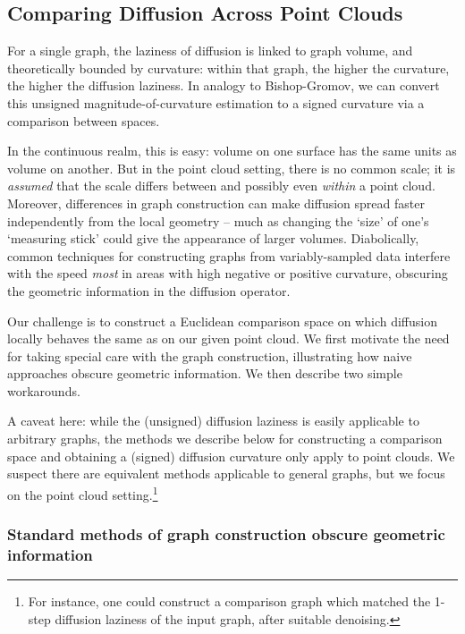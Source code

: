 \documentclass[
  letterpaper,
  DIV=11,
  numbers=noendperiod]{scrartcl}
\theoremstyle{plain}
\theoremstyle{plain}
\theoremstyle{definition}
\theoremstyle{plain}
\theoremstyle{definition}
\theoremstyle{remark}
\begin{document}
\subsection{Comparing Diffusion Across Point
Clouds}\label{comparing-diffusion-across-point-clouds}

For a single graph, the laziness of diffusion is linked to graph volume,
and theoretically bounded by curvature: within that graph, the higher
the curvature, the higher the diffusion laziness. In analogy to
Bishop-Gromov, we can convert this unsigned magnitude-of-curvature
estimation to a signed curvature via a comparison between spaces.

In the continuous realm, this is easy: volume on one surface has the
same units as volume on another. But in the point cloud setting, there
is no common scale; it is \emph{assumed} that the scale differs between
and possibly even \emph{within} a point cloud. Moreover, differences in
graph construction can make diffusion spread faster independently from
the local geometry -- much as changing the `size' of one's `measuring
stick' could give the appearance of larger volumes. Diabolically, common
techniques for constructing graphs from variably-sampled data interfere
with the speed \emph{most} in areas with high negative or positive
curvature, obscuring the geometric information in the diffusion
operator.

Our challenge is to construct a Euclidean comparison space on which
diffusion locally behaves the same as on our given point cloud. We first
motivate the need for taking special care with the graph construction,
illustrating how naive approaches obscure geometric information. We then
describe two simple workarounds.

A caveat here: while the (unsigned) diffusion laziness is easily
applicable to arbitrary graphs, the methods we describe below for
constructing a comparison space and obtaining a (signed) diffusion
curvature only apply to point clouds. We suspect there are equivalent
methods applicable to general graphs, but we focus on the point cloud
setting.\footnote{For instance, one could construct a comparison graph
  which matched the 1-step diffusion laziness of the input graph, after
  suitable denoising.}

\subsubsection{Standard methods of graph construction obscure geometric
information}\label{standard-methods-of-graph-construction-obscure-geometric-information}
\end{document}
